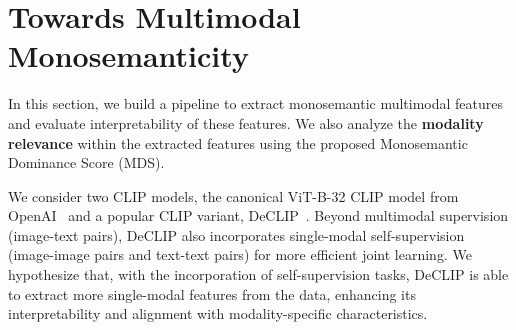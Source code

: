 



\section{Towards Multimodal Monosemanticity}
\label{sec:disentangle}
In this section, we build a pipeline to extract monosemantic multimodal features and evaluate interpretability of these features. We also analyze the \textbf{modality relevance} within the extracted features using the proposed Monosemantic Dominance Score (MDS).

We consider two CLIP models, the canonical ViT-B-32 CLIP model from OpenAI~\citep{radford2021learning} and a popular CLIP variant, DeCLIP~\citep{li2022supervision}. Beyond multimodal supervision (image-text pairs), DeCLIP also incorporates single-modal self-supervision (image-image pairs and text-text pairs) for more efficient joint learning. We hypothesize that, with the incorporation of self-supervision tasks, DeCLIP is able to extract more single-modal features from the data, enhancing its interpretability and alignment with modality-specific characteristics.

